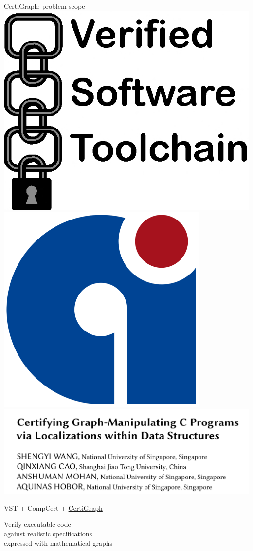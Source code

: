 \documentclass[usenames, xcolor=dvipsnames]{beamer}
\begin{document}
\begin{frame}{CertiGraph: problem scope}
\includegraphics[scale=0.09]{vst_logo}
\hspace{2em} \includegraphics[scale=0.12]{compcert_logo}
\hspace{2em} \includegraphics[scale=0.2]{paper_screen}

\bigskip
VST + CompCert + \underline{CertiGraph}

\bigskip
\hspace{1em}Verify executable code
\\\hspace{1em}against realistic specifications
\\\hspace{1em}expressed with mathematical graphs

\end{frame}
\end{document}
